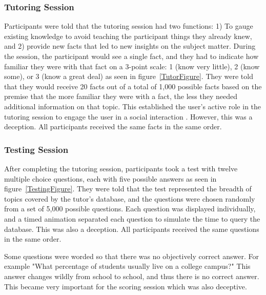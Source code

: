 \documentclass{sig-alternate-05-2015}
\begin{document}
\subsubsection{Tutoring Session}
Participants were told that the tutoring session had two functions: 1) To gauge existing knowledge to avoid teaching the participant things they already knew, and 2) provide new facts that led to new insights on the subject matter.  During the session, the participant would see a single fact, and they had to indicate how familiar they were with that fact on a 3-point scale: 1 (know very little), 2 (know some), or 3 (know a great deal) as seen in figure~\ref{TutorFigure}. They were told that they would receive 20 facts out of a total of 1,000 possible facts based on the premise that the more familiar they were with a fact, the less they needed additional information on that topic.  This established the user's active role in the tutoring session to engage the user in a social interaction \cite{nass1993voices}.  However, this was a deception.  All participants received the same facts in the same order.

\subsubsection{Testing Session}
After completing the tutoring session, participants took a test with twelve multiple choice questions, each with five possible answers as seen in figure~\ref{TestingFigure}.  They were told that the test represented the breadth of topics covered by the tutor's database, and the questions were chosen randomly from a set of 5,000 possible questions.   Each question was displayed individually, and a timed animation separated each question to simulate the time to query the database.  This was also a deception.  All participants received the same questions in the same order.  

Some questions were worded so that there was no objectively correct answer.  For example "What percentage of students usually live on a college campus?"  This answer changes wildly from school to school, and thus there is no correct answer.  This became very important for the scoring session which was also deceptive.  
\end{document}

